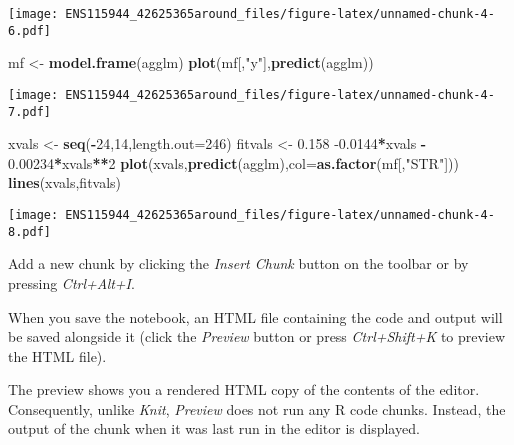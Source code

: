\documentclass[
]{article}
\newenvironment{Shaded}{\begin{snugshade}}{\end{snugshade}}
\newcommand{\DataTypeTok}[1]{\textcolor[rgb]{0.13,0.29,0.53}{#1}}
\newcommand{\DecValTok}[1]{\textcolor[rgb]{0.00,0.00,0.81}{#1}}
\newcommand{\FloatTok}[1]{\textcolor[rgb]{0.00,0.00,0.81}{#1}}
\newcommand{\KeywordTok}[1]{\textcolor[rgb]{0.13,0.29,0.53}{\textbf{#1}}}
\newcommand{\NormalTok}[1]{#1}
\newcommand{\OperatorTok}[1]{\textcolor[rgb]{0.81,0.36,0.00}{\textbf{#1}}}
\newcommand{\StringTok}[1]{\textcolor[rgb]{0.31,0.60,0.02}{#1}}
\begin{document}
\begin{Shaded}
\end{Shaded}

\texttt{[image: ENS115944\_42625365around\_files/figure-latex/unnamed-chunk-4-6.pdf]}

\begin{Shaded}
\begin{Highlighting}[]
\NormalTok{mf <-}\StringTok{ }\KeywordTok{model.frame}\NormalTok{(agglm)}
\KeywordTok{plot}\NormalTok{(mf[,}\StringTok{"y"}\NormalTok{],}\KeywordTok{predict}\NormalTok{(agglm))}
\end{Highlighting}
\end{Shaded}

\texttt{[image: ENS115944\_42625365around\_files/figure-latex/unnamed-chunk-4-7.pdf]}

\begin{Shaded}
\begin{Highlighting}[]
\NormalTok{xvals <-}\StringTok{ }\KeywordTok{seq}\NormalTok{(}\OperatorTok{-}\DecValTok{24}\NormalTok{,}\DecValTok{14}\NormalTok{,}\DataTypeTok{length.out=}\DecValTok{246}\NormalTok{)}
\NormalTok{fitvals <-}\StringTok{ }\FloatTok{0.158} \FloatTok{-0.0144}\OperatorTok{*}\NormalTok{xvals }\OperatorTok{-}\StringTok{ }\FloatTok{0.00234}\OperatorTok{*}\NormalTok{xvals}\OperatorTok{**}\DecValTok{2}
\KeywordTok{plot}\NormalTok{(xvals,}\KeywordTok{predict}\NormalTok{(agglm),}\DataTypeTok{col=}\KeywordTok{as.factor}\NormalTok{(mf[,}\StringTok{"STR"}\NormalTok{]))}
\KeywordTok{lines}\NormalTok{(xvals,fitvals)}
\end{Highlighting}
\end{Shaded}

\texttt{[image: ENS115944\_42625365around\_files/figure-latex/unnamed-chunk-4-8.pdf]}

Add a new chunk by clicking the \emph{Insert Chunk} button on the
toolbar or by pressing \emph{Ctrl+Alt+I}.

When you save the notebook, an HTML file containing the code and output
will be saved alongside it (click the \emph{Preview} button or press
\emph{Ctrl+Shift+K} to preview the HTML file).

The preview shows you a rendered HTML copy of the contents of the
editor. Consequently, unlike \emph{Knit}, \emph{Preview} does not run
any R code chunks. Instead, the output of the chunk when it was last run
in the editor is displayed.
\end{document}
